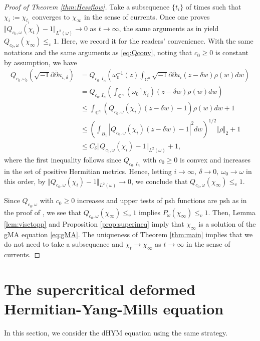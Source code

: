 \documentclass{amsart}
\numberwithin{equation}{section}
\theoremstyle{plain}
\theoremstyle{definition}
\theoremstyle{remark}
\newcommand{\delb}{\sqrt{-1}\partial\bar{\partial}}
\begin{document}
\begin{proof}[Proof of Theorem \ref{thm:Hessflow}]
    Take a subsequence $\{t_i\}$ of times such that $\chi_i:=\chi_{t_i}$ converges to $\chi_\infty$ in the sense of currents. Once one proves $\Vert Q_{c_0,\omega}(\chi_t)-1\Vert_{L^2(\omega)}\to0$ as $t\to\infty$, the same arguments as in \cite[Proposition 2.8]{Mur} yield $Q_{c_0,\omega}(\chi_\infty)\le_v1$. Here, we record it for the readers' convenience.
    With the same notations and the same arguments as \eqref{eq:Qconv}, noting that $c_0\ge0$ is constant by assumption, we have
    \begin{equation*}
        \begin{aligned}
            Q_{c_0,\omega_0}(\delb u_{i,\delta})
            &=Q_{c_0,I_n}\left(\omega_0^{-1}(z)\int_{\mathbb{C}^n}\delb u_i(z-\delta w)\rho(w)dw\right)\\
            &=Q_{c_0,I_n}\left(\int_{\mathbb{C}^n}(\omega_0^{-1}\chi_i)(z-\delta w)\rho(w)dw\right)\\
            &\le\int_{\mathbb{C}^n} \left(Q_{c_0,\omega}(\chi_i)(z-\delta w)-1\right)\rho(w)dw+1\\
            &\le\left(\int_{B_1} \left\vert Q_{c_0,\omega}(\chi_i)(z-\delta w)-1\right\vert^2dw\right)^{1/2}\Vert \rho\Vert_2+1\\
            &\le C_\delta \Vert Q_{c_0,\omega}(\chi_i)-1\Vert_{L^2(\omega)}+1,
        \end{aligned}
    \end{equation*}
    where the first inequality follows since $Q_{c_0,I_n}$ with $c_0\ge0$ is convex and increases in the set of positive Hermitian metrics. Hence, letting $i\to\infty, \ \delta\to0, \ \omega_0\to\omega$ in this order, by $\Vert Q_{c_0,\omega}(\chi_i)-1\Vert_{L^2(\omega)}\to0$, we conclude that $Q_{c_0,\omega}(\chi_\infty)\le_v1$. 
    
    Since $Q_{c_0,\omega}$ with $c_0\ge0$ increases and upper tests of psh functions are psh as in the proof of \cite[Proposition 1.3]{EGZ}, we see that $Q_{c_0,\omega}(\chi_\infty)\le_v1$ implies $P_\omega(\chi_\infty)\le_v1$. 
    Then, Lemma \ref{lem:visctopp} and Proposition \ref{prop:superineq} imply that $\chi_\infty$ is a solution of the gMA equation \eqref{eq:gMA}. The uniqueness of Theorem \ref{thm:main} implies that we do not need to take a subsequence and $\chi_t\to\chi_\infty$ as $t\to\infty$ in the sense of currents.
    \end{proof}

\section{The supercritical deformed Hermitian-Yang-Mills equation}\label{sec:dHYM}
In this section, we consider the dHYM equation using the same strategy. 
\end{document}
